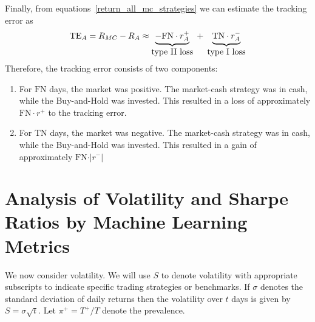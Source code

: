 \documentclass{article}
\begin{document}
\begin{comment}
Since $\text{FN}=(1-\text{TPR})\, T^{+}$ and $\text{FP}=(1-\text{TNR})\, T^{-}$,
we can re-write the expression in equation~\eqref{mc_underperformance} as follows
\begin{equation}
 R^{\max}- R^{mc}  \approx  (1-\text{TPR})\, T^{+}\cdot \vert r^{+} \vert
 + (1-\text{TNR})\, T^{-}\cdot \vert r^{-} \vert
    \label{mc_underperformance_ratios}
\end{equation}
The above equation~\eqref{mc_underperformance_ratios} states that the under-performance of our strategy
is determined by our failure rate to detect true positive and true negative days and by the absolute values of the returns for the days when we make these mistakes.
\end{comment}

Finally, from equations~\eqref{return_all_mc_strategies} we can estimate the tracking error as
\begin{equation}
\text{TE}_{A}=R_{MC}-R_{A} \approx\underbrace{-\text{FN} \cdot r_{A}^{+}}_{\hbox{type II loss}}
\; + \;  \underbrace{\text{TN}\cdot r_{A}^{-} }_{\hbox{type I loss}}
\label{r_mc_tracking_error}
\end{equation}
Therefore, the  tracking error consists of two components:
\medskip
\begin{enumerate}[nosep]
\item For $\text{FN}$ days, the market was positive. The market-cash strategy was in cash, while the Buy-and-Hold 
was invested. This resulted in a loss of approximately $\text{FN} \cdot r^{+}$ to the tracking error.
\item For $\text{TN}$ days, the market was negative.  The market-cash strategy was in cash, while the Buy-and-Hold was invested. This resulted in a gain of approximately
$\text{FN} \cdot \vert r^{-}\vert $
   
\end{enumerate}


\section{Analysis of Volatility and Sharpe Ratios by Machine Learning Metrics}\label{section_volatility}

We now consider volatility. We will use $S$ to denote volatility with appropriate subscripts to
indicate specific trading strategies or benchmarks. If $\sigma$ denotes the standard deviation of daily returns then the volatility over $t$ days is given by  $S=\sigma\sqrt{t}$. Let $\pi^{+}=T^{+}/T$ denote the prevalence.
\end{document}
